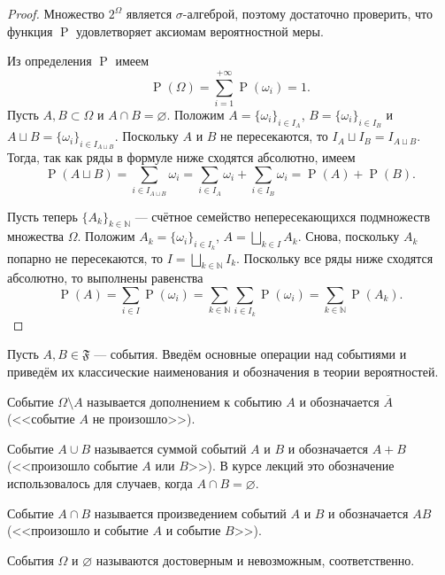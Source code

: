 \documentclass[12pt]{article}
\numberwithin{theorem}{section}
\theoremstyle{definition}
\newcommand{\prob}{\operatorname{P}}
\newcommand{\defin}[2]{\hypertarget{#2}{{\color{red} #1}}}
\newcommand{\events}{\mathfrak{F}}
\begin{document}
	\begin{proof}
		
		Множество $ 2^{\Omega} $ является $ \sigma $-алгеброй, поэтому достаточно проверить, что функция $ \prob $
		удовлетворяет аксиомам вероятностной меры.
		
		Из определения $ \prob $ имеем
		$$ \prob(\Omega) = \sum\limits_{i = 1}^{+\infty} \prob(\omega_i) = 1. $$
		Пусть $ A, B \subset \Omega $ и $ A \cap B = \varnothing $.
		Положим $ A = \{\omega_{i}\}_{i \in I_A} $, $ B = \{\omega_{i}\}_{i \in I_B} $ и 
		$ A \sqcup B = \{\omega_i\}_{i \in I_{A \sqcup B}} $. 
		Поскольку $ A $ и $ B $ не пересекаются, то $ I_A \sqcup I_B =  I_{A \sqcup B} $.
		Тогда, так как ряды в формуле ниже сходятся абсолютно, имеем
		$$ \prob(A \sqcup B) = \sum\limits_{i \in I_{A \sqcup B}} \omega_i = 
		\sum\limits_{i \in I_A} \omega_{i} + \sum\limits_{i \in I_B} \omega_{i}
		= \prob(A) + \prob(B). $$
		
		Пусть теперь $ \{A_k\}_{k \in \mathbb{N}} $ --- счётное семейство непересекающихся подмножеств множества $ \Omega $.
		Положим $ A_k = \{\omega_{i}\}_{i \in I_k} $, $ A = \bigsqcup\limits_{k \in I} A_k $.
		Снова, поскольку $ A_k $ попарно не пересекаются, то $ I = \bigsqcup\limits_{k \in \mathbb{N}} I_k $.
		Поскольку все ряды ниже сходятся абсолютно, то выполнены равенства
		$$ \prob(A) = \sum\limits_{i \in I} \prob(\omega_i) 
		= \sum\limits_{k \in \mathbb{N}} \sum\limits_{i \in I_k} \prob(\omega_i) 
		= \sum\limits_{k \in \mathbb{N}} \prob(A_k). $$
	\end{proof}
	
	Пусть $ A, B \in \events $ --- события. Введём основные операции над событиями 
	и приведём их классические наименования и обозначения в теории вероятностей. 
	
	Событие $ \Omega \setminus A $ называется
	\defin{дополнением к событию $ A $}{event-compl}
	и обозначается $ \overline{A} $ (<<событие $ A $ не произошло>>).
	
	Событие $ A \cup B $ называется
	\defin{суммой событий $ A $ и $ B $}{event-sum}
	и обозначается $ A + B $  (<<произошло событие $ A $ или $ B $>>). 
	В курсе лекций это обозначение использовалось для случаев, когда $ A \cap B = \varnothing $.
	
	Событие $ A \cap B $ называется 
	\defin{произведением событий $ A $ и $ B $}{event-product} 
	и обозначается $ AB $ (<<произошло и событие $ A $ и событие $ B $>>).
	
	События $ \Omega $ и $ \varnothing $ называются \defin{достоверным}{} и \defin{невозможным}{}, соответственно.
	
\end{document}
